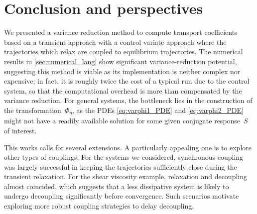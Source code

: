 \section{Conclusion and perspectives}
\label{sec:conclusion}
%
We presented a variance reduction method to compute transport coefficients based on a transient approach with a control variate approach where the trajectories which relax are coupled to equilibrium trajectories. The numerical results in \cref{sec:numerical_lang} show significant variance-reduction potential, suggesting this method is viable as its implementation is neither complex nor expensive; in fact, it is roughly twice the cost of a typical run due to the control system, so that the computational overhead is more than compensated by the variance reduction. For general systems, the bottleneck lies in the construction of the transformation~$\Phi_\eta$, as the PDEs \eqref{eq:varphi1_PDE} and \eqref{eq:varphi2_PDE} might not have a readily available solution for some given conjugate response~$S$ of interest. 

This works calls for several extensions. A particularly appealing one is to explore other types of couplings. For the systems we considered, synchronous coupling was largely successful in keeping the trajectories sufficiently close during the transient relaxation. For the shear viscosity example, relaxation and decoupling almost coincided, which suggests that a less dissipative system is likely to undergo decoupling significantly before convergence. Such scenarios motivate exploring more robust coupling strategies to delay decoupling.
